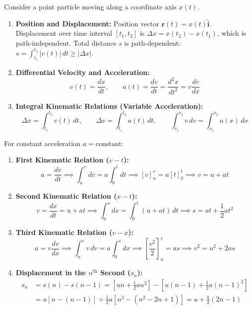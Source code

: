 \documentclass[10pt,a4paper]{article}
\begin{document}
\begin{conceptbox}
Consider a point particle moving along a coordinate axis $x(t)$.
\begin{enumerate}[leftmargin=*]
  \item \textbf{Position and Displacement:} Position vector $\mathbf{r}(t) = x(t)\hat{\mathbf{i}}$. Displacement over time interval $[t_1, t_2]$ is $\Delta x = x(t_2) - x(t_1)$, which is path-independent. Total distance $s$ is path-dependent: $s = \int_{t_1}^{t_2} |v(t)|\,dt \ge |\Delta x|$.
  \item \textbf{Differential Velocity and Acceleration:}
  \begin{equation}
    v(t) = \frac{dx}{dt}, \qquad a(t) = \frac{dv}{dt} = \frac{d^2 x}{dt^2} = v\frac{dv}{dx}
  \end{equation}
  \item \textbf{Integral Kinematic Relations (Variable Acceleration):}
  \begin{equation}
    \Delta x = \int_{t_1}^{t_2} v(t)\,dt, \qquad \Delta v = \int_{t_1}^{t_2} a(t)\,dt, \qquad \int_{v_1}^{v_2} v\,dv = \int_{x_1}^{x_2} a(x)\,dx
  \end{equation}
\end{enumerate}
\end{conceptbox}

\begin{formulabox}
For constant acceleration $a = \text{constant}$:
\begin{enumerate}[leftmargin=*]
  \item \textbf{First Kinematic Relation ($v - t$):}
  \begin{equation}
    a = \frac{dv}{dt} \implies \int_{u}^{v} dv = a\int_{0}^{t} dt \implies [v]_u^v = a[t]_0^t \implies v = u + at
  \end{equation}
  \item \textbf{Second Kinematic Relation ($x - t$):}
  \begin{equation}
    v = \frac{dx}{dt} = u + at \implies \int_{0}^{s} dx = \int_{0}^{t} (u + at)\,dt \implies s = ut + \frac{1}{2}at^2
  \end{equation}
  \item \textbf{Third Kinematic Relation ($v - x$):}
  \begin{equation}
    a = v\frac{dv}{dx} \implies \int_{u}^{v} v\,dv = a\int_{0}^{s} dx \implies \left[\frac{v^2}{2}\right]_u^v = as \implies v^2 = u^2 + 2as
  \end{equation}
  \item \textbf{Displacement in the $n^{\text{th}}$ Second ($s_n$):}
  \begin{align}
    s_n &= s(n) - s(n-1) = \left[un + \frac{1}{2}an^2\right] - \left[u(n-1) + \frac{1}{2}a(n-1)^2\right] \nonumber \\
    &= u[n - (n-1)] + \frac{1}{2}a[n^2 - (n^2 - 2n + 1)] = u + \frac{a}{2}(2n - 1)
  \end{align}
\end{enumerate}
\end{formulabox}
\end{document}
